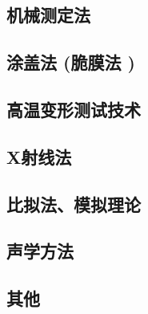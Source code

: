 \documentclass[UTF8]{../../06-Physics}
\begin{document}
    \subsection{机械测定法}
    \subsection{涂盖法 (脆膜法 )}
    \subsection{高温变形测试技术}
    \subsection{X射线法}
    \subsection{比拟法、模拟理论}
    \subsection{声学方法}
    \subsection{其他}
\end{document}
